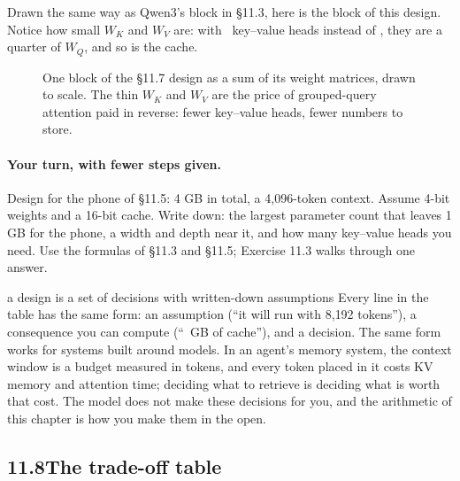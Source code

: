 Drawn the same way as Qwen3's block in \S11.3, here is the block of this design. Notice how small $W_K$ and
$W_V$ are: with \nElevenBKv\ key--value heads instead of \nElevenBH, they are a quarter of $W_Q$, and so is the
cache.

\begin{figure}[!htb]
\centering

\caption{One block of the \S11.7 design as a sum of its weight matrices, drawn to scale. The thin $W_K$ and
$W_V$ are the price of grouped-query attention paid in reverse: fewer key--value heads, fewer numbers to store.}
\end{figure}

\paragraph{Your turn, with fewer steps given.} Design for the phone of \S11.5: 4 GB in total, a
4{,}096-token context. Assume 4-bit weights and a 16-bit cache. Write down: the largest parameter count
that leaves 1 GB for the phone, a width and depth near it, and how many key--value heads you need. Use the
formulas of \S11.3 and \S11.5; Exercise 11.3 walks through one answer.

\begin{principle}{a design is a set of decisions with written-down assumptions}
Every line in the table has the same form: an assumption (``it will run with 8{,}192 tokens''), a
consequence you can compute (``\nElevenBKvGB\ GB of cache''), and a decision. The same form works for systems built
around models. In an agent's memory system, the context window is a budget measured in tokens, and every
token placed in it costs KV memory and attention time; deciding what to retrieve is deciding what is worth
that cost. The model does not make these decisions for you, and the arithmetic of this chapter is how you
make them in the open.
\end{principle}

\subsection*{11.8\quad The trade-off table}

